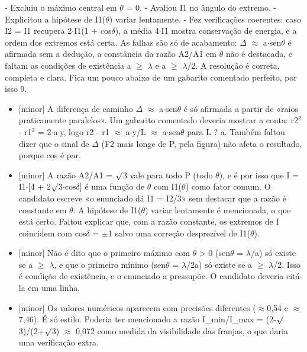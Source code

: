 \documentclass{article}%
\begin{document}
{-} Excluiu o máximo central em $\theta$ = 0.\newline%
{-} Avaliou I1 no ângulo do extremo.\newline%
{-} Explicitou a hipótese de I1($\theta$) variar lentamente.\newline%
{-} Fez verificações coerentes: caso I2 = I1 recupera 2$\cdot$I1(1 + cos$\delta$), a média 4$\cdot$I1 mostra conservação de energia, e a ordem dos extremos está certa.\newline%
\newline%
As falhas são só de acabamento: $\Delta$ $\approx$ a$\cdot$sen$\theta$ é afirmada sem a dedução, a constância da razão A2/A1 em $\theta$ não é destacada, e faltam as condições de existência a $\geq$ $\lambda$ e a $\geq$ $\lambda$/2. A resolução é correta, completa e clara. Fica um pouco abaixo de um gabarito comentado perfeito, por isso 9.%
\begin{itemize}%
\item%
{[}minor{]} A diferença de caminho $\Delta$ $\approx$ a$\cdot$sen$\theta$ é só afirmada a partir de «raios praticamente paralelos». Um gabarito comentado deveria mostrar a conta: r2$^2$ - r1$^2$ = 2$\cdot$a$\cdot$y, logo r2 - r1 $\approx$ a$\cdot$y/L $\approx$ a$\cdot$sen$\theta$ para L ? a. Também faltou dizer que o sinal de $\Delta$ (F2 mais longe de P, pela figura) não afeta o resultado, porque cos é par.%
\item%
{[}minor{]} A razão A2/A1 = $\surd$3 vale para todo P (todo $\theta$), e é por isso que I = I1$\cdot${[}4 + 2$\surd$3$\cdot$cos$\delta${]} é uma função de $\theta$ com I1($\theta$) como fator comum. O candidato escreve «o enunciado dá I1 = I2/3» sem destacar que a razão é constante em $\theta$. A hipótese de I1($\theta$) variar lentamente é mencionada, o que está certo. Faltou explicar que, com a razão constante, os extremos de I coincidem com cos$\delta$ = $\pm$1 salvo uma correção desprezível de I1($\theta$).%
\item%
{[}minor{]} Não é dito que o primeiro máximo com $\theta$ > 0 (sen$\theta$ = $\lambda$/a) só existe se a $\geq$ $\lambda$, e que o primeiro mínimo (sen$\theta$ = $\lambda$/2a) só existe se a $\geq$ $\lambda$/2. Isso é condição de existência, e o enunciado a pressupõe. O candidato deveria citá{-}la em uma linha.%
\item%
{[}minor{]} Os valores numéricos aparecem com precisões diferentes ($\approx$0,54 e $\approx$7,46). É só estilo. Poderia ter mencionado a razão I\_min/I\_max = (2-$\surd$3)/(2+$\surd$3) $\approx$ 0,072 como medida da visibilidade das franjas, o que daria uma verificação extra.%
\end{itemize}%
\end{document}
